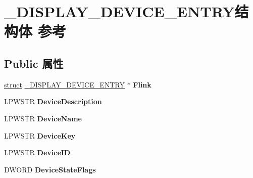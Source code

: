 \hypertarget{struct___d_i_s_p_l_a_y___d_e_v_i_c_e___e_n_t_r_y}{}\section{\+\_\+\+D\+I\+S\+P\+L\+A\+Y\+\_\+\+D\+E\+V\+I\+C\+E\+\_\+\+E\+N\+T\+R\+Y结构体 参考}
\label{struct___d_i_s_p_l_a_y___d_e_v_i_c_e___e_n_t_r_y}
\subsection*{Public 属性}
\begin{DoxyCompactItemize}
\item 
\mbox{\label{struct___d_i_s_p_l_a_y___d_e_v_i_c_e___e_n_t_r_y_a13e65e49b7d7631c9b062250b1fd4a19}} 
\hyperlink{interfacestruct}{struct} \hyperlink{struct___d_i_s_p_l_a_y___d_e_v_i_c_e___e_n_t_r_y}{\+\_\+\+D\+I\+S\+P\+L\+A\+Y\+\_\+\+D\+E\+V\+I\+C\+E\+\_\+\+E\+N\+T\+RY} $\ast$ {\bfseries Flink}
\item 
\mbox{\label{struct___d_i_s_p_l_a_y___d_e_v_i_c_e___e_n_t_r_y_a8486a2ca89736adc5a07225449f2eb0a}} 
L\+P\+W\+S\+TR {\bfseries Device\+Description}
\item 
\mbox{\label{struct___d_i_s_p_l_a_y___d_e_v_i_c_e___e_n_t_r_y_afa44d6cfad0c708f4ab821f74589bbe5}} 
L\+P\+W\+S\+TR {\bfseries Device\+Name}
\item 
\mbox{\label{struct___d_i_s_p_l_a_y___d_e_v_i_c_e___e_n_t_r_y_ac2bf658345a426ce0adc30727e842e39}} 
L\+P\+W\+S\+TR {\bfseries Device\+Key}
\item 
\mbox{\label{struct___d_i_s_p_l_a_y___d_e_v_i_c_e___e_n_t_r_y_a79e3d458abd5f46c48b810dac1bbb123}} 
L\+P\+W\+S\+TR {\bfseries Device\+ID}
\item 
\mbox{\label{struct___d_i_s_p_l_a_y___d_e_v_i_c_e___e_n_t_r_y_a4f086540a19460b209a20c9f8b9f27f2}} 
D\+W\+O\+RD {\bfseries Device\+State\+Flags}

\end{DoxyCompactItemize}
